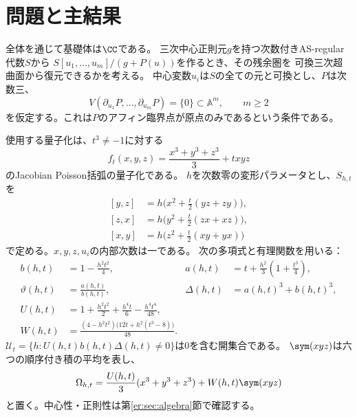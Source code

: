 \section{問題と主結果}\label{er:sec:intro}

全体を通じて基礎体は$\CC$である。
三次中心正則元$g$を持つ次数付きAS-regular代数$S$から
$S[u_1,\ldots,u_m]/(g+P(u))$を作るとき、その残余圏を
可換三次超曲面から復元できるかを考える。
中心変数$u_i$は$S$の全ての元と可換とし、$P$は次数三、
\begin{equation}\label{er:eq:isolated}
 V(\partial_{u_1}P,\ldots,\partial_{u_m}P)=\{0\}\subset\mathbb A^m,
 \qquad m\ge2
\end{equation}
を仮定する。これは$P$のアフィン臨界点が原点のみであるという条件である。

使用する量子化は、$t^3\ne-1$に対する
\[
 f_t(x,y,z)=\frac{x^3+y^3+z^3}{3}+txyz
\]
のJacobian Poisson括弧の量子化である。
$h$を次数零の変形パラメータとし、$S_{h,t}$を
\begin{equation}\label{er:eq:relations}
\begin{aligned}
 [y,z]&=h\bigl(x^2+\tfrac t2(yz+zy)\bigr),\\
 [z,x]&=h\bigl(y^2+\tfrac t2(zx+xz)\bigr),\\
 [x,y]&=h\bigl(z^2+\tfrac t2(xy+yx)\bigr)
\end{aligned}
\end{equation}
で定める。$x,y,z,u_i$の内部次数は一である。
次の多項式と有理関数を用いる：
\begin{equation}\label{er:eq:coefficients}
\begin{aligned}
 b(h,t)&=1-\frac{h^2t^2}{4},&
 a(h,t)&=t+\frac{h^2}{3}\left(1+\frac{t^3}{4}\right),\\
 \vartheta(h,t)&=\frac{a(h,t)}{b(h,t)},&
 \Delta(h,t)&=a(h,t)^3+b(h,t)^3,\\
 U(h,t)&=1+\frac{h^2t^2}{2}+\frac{h^4t}{6}-\frac{h^4t^4}{48},\\
 W(h,t)&=\frac{(4-h^2t^2)\bigl(12t+h^2(t^3-8)\bigr)}{48}.
\end{aligned}
\end{equation}
$\mathscr U_t=\{h:U(h,t)b(h,t)\Delta(h,t)\ne0\}$は$0$を含む開集合である。
$\sym(xyz)$は六つの順序付き積の平均を表し、
\begin{equation}\label{er:eq:center}
 \Omega_{h,t}=\frac{U(h,t)}3(x^3+y^3+z^3)+W(h,t)\sym(xyz)
\end{equation}
と置く。中心性・正則性は第\ref{er:sec:algebra}節で確認する。

